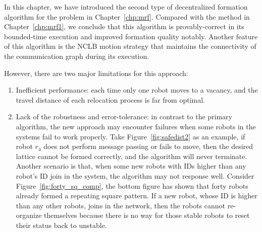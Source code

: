 In this chapter, we have introduced the second type of decentralized formation algorithm for the problem in Chapter~\ref{chp:mrf}.
%
Compared with the method in Chapter~\ref{chp:mrf1}, we conclude that this algorithm is provably-correct in its bounded-time execution and improved formation quality notably.
%
Another feature of this algorithm is the NCLB motion strategy that maintains the connectivity of the communication graph during its execution.


However, there are two major limitations for this approach:
\begin{enumerate}
\item Inefficient performance: each time only one robot moves to a vacancy, and the travel distance of each relocation process is far from optimal.
\item Lack of the robustness and error-tolerance: in contrast to the primary algorithm, the new approach may encounter failures when some robots in the systems fail to work properly. Take Figure~\ref{fig:safedist2} as an example, if robot $r_4$ does not perform message passing or fails to move, then the desired lattice cannot be formed correctly, and the algorithm will never terminate. 
Another scenario is that, when some new robots with IDs higher than any robot's ID join in the system, the algorithm may not response well. 
Consider Figure~\ref{fig:forty_sq_comp}, the bottom figure has shown that forty robots already formed a repeating square pattern. 
If a new robot, whose ID is higher than any other robots, joins in the network, then the robots cannot re-organize themselves because there is no way for those stable robots to reset their status back to unstable.
\end{enumerate}




